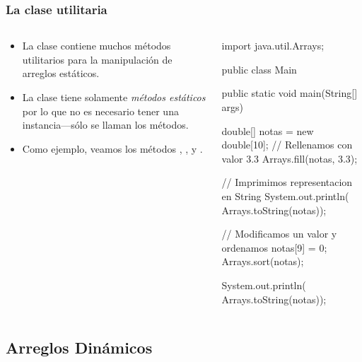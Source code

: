 \documentclass{beamer}
\begin{document}
\begin{frame}[fragile]
  \frametitle{La clase utilitaria }

  \begin{columns}
    \begin{column}{0.4\textwidth}
      \begin{small}
        \begin{itemize}

        \item La clase  contiene muchos métodos
          utilitarios para la manipulación de arreglos estáticos.
          
        \item La clase tiene solamente \emph{métodos estáticos} por lo
          que no es necesario tener una instancia---sólo se llaman los métodos.
          
        \item Como ejemplo, veamos los métodos ,
          , y .
          
        \end{itemize}
      \end{small}
    \end{column}
    \begin{column}{0.6\textwidth}
      \begin{jsmall}
        import java.util.Arrays;
        
        public class Main {
          public static void main(String[] args) {            
            double[] notas   = new double[10];
            // Rellenamos con valor 3.3
            Arrays.fill(notas, 3.3);
            
            // Imprimimos representacion en String
            System.out.println(
                Arrays.toString(notas));

            // Modificamos un valor y ordenamos
            notas[9] = 0; Arrays.sort(notas);

            System.out.println(
                Arrays.toString(notas));
          }
        }
      \end{jsmall}      
    \end{column}
  \end{columns}

\end{frame}

\subsection{Arreglos Dinámicos}
\end{document}
